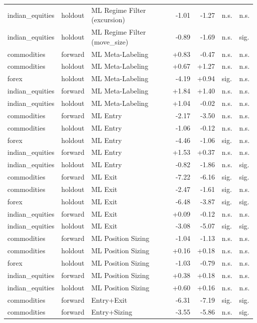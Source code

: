 \begin{longtable}{l l l r r l l}
indian\_equities & holdout & ML Regime Filter (excursion) & -1.01 & -1.27 & n.s. & n.s. \\
indian\_equities & holdout & ML Regime Filter (move\_size) & -0.89 & -1.69 & n.s. & sig. \\
commodities & forward & ML Meta-Labeling & +0.83 & -0.47 & n.s. & n.s. \\
commodities & holdout & ML Meta-Labeling & +0.67 & +1.27 & n.s. & n.s. \\
forex & holdout & ML Meta-Labeling & -4.19 & +0.94 & sig. & n.s. \\
indian\_equities & forward & ML Meta-Labeling & +1.84 & +1.40 & n.s. & n.s. \\
indian\_equities & holdout & ML Meta-Labeling & +1.04 & -0.02 & n.s. & n.s. \\
commodities & forward & ML Entry & -2.17 & -3.50 & n.s. & n.s. \\
commodities & holdout & ML Entry & -1.06 & -0.12 & n.s. & n.s. \\
forex & holdout & ML Entry & -4.46 & -1.06 & sig. & n.s. \\
indian\_equities & forward & ML Entry & +1.53 & +0.37 & n.s. & n.s. \\
indian\_equities & holdout & ML Entry & -0.82 & -1.86 & n.s. & sig. \\
commodities & forward & ML Exit & -7.22 & -6.16 & sig. & sig. \\
commodities & holdout & ML Exit & -2.47 & -1.61 & sig. & n.s. \\
forex & holdout & ML Exit & -6.48 & -3.87 & sig. & sig. \\
indian\_equities & forward & ML Exit & +0.09 & -0.12 & n.s. & n.s. \\
indian\_equities & holdout & ML Exit & -3.08 & -5.07 & sig. & sig. \\
commodities & forward & ML Position Sizing & -1.04 & -1.13 & n.s. & n.s. \\
commodities & holdout & ML Position Sizing & +0.16 & +0.18 & n.s. & n.s. \\
forex & holdout & ML Position Sizing & -1.03 & -0.79 & n.s. & n.s. \\
indian\_equities & forward & ML Position Sizing & +0.38 & +0.18 & n.s. & n.s. \\
indian\_equities & holdout & ML Position Sizing & +0.60 & +0.16 & n.s. & n.s. \\
commodities & forward & Entry+Exit & -6.31 & -7.19 & sig. & sig. \\
commodities & forward & Entry+Sizing & -3.55 & -5.86 & n.s. & sig. \\

\end{longtable}
